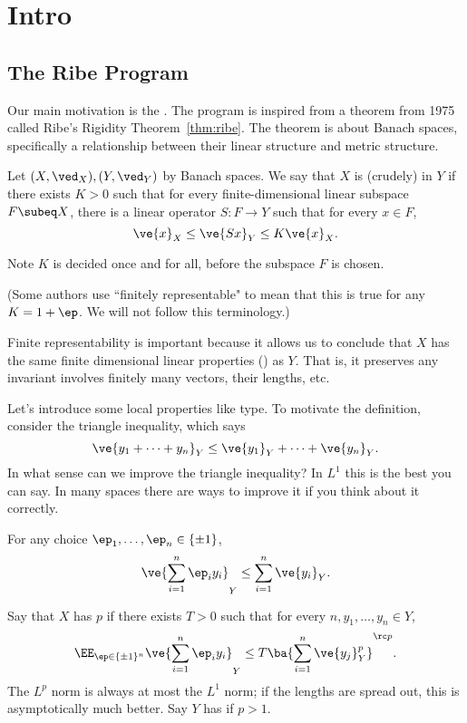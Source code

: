 \chapter{Intro}



\section{The Ribe Program}
Our main motivation is the . The program is inspired from a theorem from 1975 called Ribe's Rigidity Theorem~\ref{thm:ribe}. The theorem is about Banach spaces, specifically a relationship between their linear structure and metric structure.

\begin{df}
Let $(X,\ved_X), (Y,\ved_Y)$ by Banach spaces. We say that $X$ is (crudely)  in $Y$ if there exists $K>0$ such that for every finite-dimensional linear subspace $F\subeq X$, there is a linear operator $S:F\to Y$ such that for every $x\in F$, 
\[
\ve{x}_X\le \ve{Sx}_Y\le K\ve{x}_X.
\]
\end{df}
Note $K$ is decided once and for all, before the subspace $F$ is chosen.

(Some authors use ``finitely representable" to mean that this is true for any $K=1+\ep$. We will not follow this terminology.)

Finite representability is important because %
it allows us to conclude that $X$ has the same finite dimensional linear properties () as $Y$. That is, it preserves any invariant involves finitely many vectors, their lengths, etc.

Let's introduce some local properties like type. To motivate the definition, 
consider the triangle inequality, which says 
\[
\ve{y_1+\cdots +y_n}_Y\le \ve{y_1}_Y+\cdots +\ve{y_n}_Y.
\]
In what sense can we improve the triangle inequality? In $L^1$ this is the best you can say. In many spaces there are ways to improve it if you think about it correctly.

For any choice $\ep_1,\ldots, \ep_n\in \{\pm 1\}$, 
\[
\ve{\sum_{i=1}^n \ep_i y_i}_Y \le \sum_{i=1}^n \ve{y_i}_Y.
\]
\begin{df}
Say that $X$ has  $p$ if there exists $T>0$ such that for every $n, y_1,\ldots, y_n\in Y$, 
\[
\EE_{\ep\in \{\pm 1\}^n} \ve{\sum_{i=1}^n \ep_i y_i}_Y\le T\ba{\sum_{i=1}^n \ve{y_j}_Y^p}^{\rc p}.
\]
The $L^p$ norm is always at most the $L^1$ norm; if the lengths are spread out, this is asymptotically much better. Say $Y$ has  if $p>1$.
\end{df}

